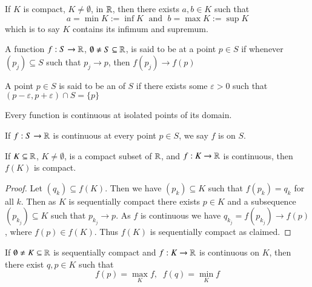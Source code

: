 If $K$ is compact, $K \neq \emptyset$, in $\mathbb R$, then there exists $a,b \in K$ such that $$a = \min K := \inf K\;\text{ and }\;b = \max K := \sup K$$ which is to say $K$ contains its infimum and supremum.

\begin{definition}
    A function $f:S\rightarrow \mathbb R$, $\emptyset \neq S \subseteq \mathbb R$, is said to be  at a point $p \in S$ if whenever $(p_j) \subseteq S$ such that $p_j\rightarrow p$, then $f(p_j)\rightarrow f(p)$
\end{definition}

\begin{definition}
    A point $p \in S$ is said to be an  of $S$ if there exists some $\varepsilon > 0$ such that $(p-\varepsilon,p+\varepsilon) \cap S = \{p\}$
\end{definition}
Every function is continuous at isolated points of its domain.

\begin{definition}
    If $f:S\rightarrow \mathbb R$ is continuous at every point $p \in S$, we say $f$ is  on $S$.
\end{definition}

\begin{proposition}\label{prop:1.9.4}
    If $K \subseteq \mathbb R$, $K \neq \emptyset$, is a compact subset of $\mathbb R$, and $f:K\rightarrow \mathbb R$ is continuous, then $f(K)$ is compact.
\end{proposition}
\begin{proof}
    Let $(q_k) \subseteq f(K)$. Then we have $(p_k) \subseteq K$ such that $f(p_k) = q_k$ for all $k$. Then as $K$ is sequentially compact there exists $p \in K$ and a subsequence $(p_{k_j}) \subseteq K$ such that $p_{k_j}\rightarrow p$. As $f$ is continuous we have $q_{k_j} = f(p_{k_j}) \rightarrow f(p)$, where $f(p) \in f(K)$. Thus $f(K)$ is sequentially compact as claimed.
\end{proof}

\begin{proposition}\label{prop:1.9.5}
    If $\emptyset \neq K \subseteq \mathbb R$ is sequentially compact and $f:K\rightarrow \mathbb R$ is continuous on $K$, then there exist $q,p \in K$ such that $$f(p) = \max_{K}f,\;\;f(q) = \min_Kf$$
\end{proposition}

